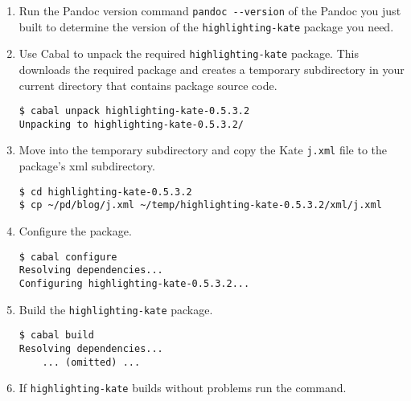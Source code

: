 \begin{enumerate}
\item
  Run the Pandoc version command \texttt{pandoc -{}-version} of the
  Pandoc you just built to determine the version of the
  \texttt{highlighting-kate} package you need.
\item
  Use Cabal to unpack the required \texttt{highlighting-kate} package.
  This downloads the required package and creates a temporary
  subdirectory in your current directory that contains package source
  code.

\begin{tcolorbox}[breakable, size=fbox, boxrule=1pt, pad at break*=1mm,colback=cellbackground, colframe=cellborder]
\begin{verbatim}
$ cabal unpack highlighting-kate-0.5.3.2
Unpacking to highlighting-kate-0.5.3.2/
\end{verbatim}
\end{tcolorbox}
\item
  Move into the temporary subdirectory and copy the Kate \texttt{j.xml}
  file to the package's xml subdirectory.

\begin{tcolorbox}[breakable, size=fbox, boxrule=1pt, pad at break*=1mm,colback=cellbackground, colframe=cellborder]
\begin{verbatim}
$ cd highlighting-kate-0.5.3.2
$ cp ~/pd/blog/j.xml ~/temp/highlighting-kate-0.5.3.2/xml/j.xml
\end{verbatim}
\end{tcolorbox}
\item
  Configure the package.

\begin{tcolorbox}[breakable, size=fbox, boxrule=1pt, pad at break*=1mm,colback=cellbackground, colframe=cellborder]
\begin{verbatim}
$ cabal configure
Resolving dependencies...
Configuring highlighting-kate-0.5.3.2...
\end{verbatim}
\end{tcolorbox}
\item
  Build the \texttt{highlighting-kate} package.

\begin{tcolorbox}[breakable, size=fbox, boxrule=1pt, pad at break*=1mm,colback=cellbackground, colframe=cellborder]
\begin{verbatim}
$ cabal build
Resolving dependencies...
    ... (omitted) ...
\end{verbatim}
\end{tcolorbox}
\item
  If \texttt{highlighting-kate} builds without problems run the command.


\end{enumerate}
